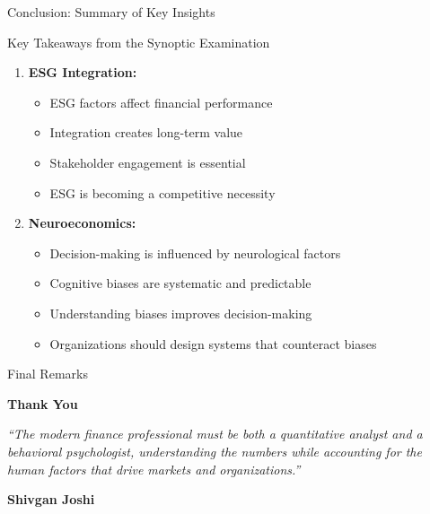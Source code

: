\documentclass[aspectratio=169]{beamer}
\begin{document}
\begin{frame}{Conclusion: Summary of Key Insights}
\begin{block}{Key Takeaways from the Synoptic Examination}
\begin{enumerate}
				\item \textbf{ESG Integration:}
				\begin{itemize}
					\item ESG factors affect financial performance
					\item Integration creates long-term value
					\item Stakeholder engagement is essential
					\item ESG is becoming a competitive necessity
				\end{itemize}
				
				\item \textbf{Neuroeconomics:}
				\begin{itemize}
					\item Decision-making is influenced by neurological factors
					\item Cognitive biases are systematic and predictable
					\item Understanding biases improves decision-making
					\item Organizations should design systems that counteract biases
				\end{itemize}
			\end{enumerate}
		\end{block}
	\end{frame}
	
	\begin{frame}{Final Remarks}
		\begin{center}
			\Huge\textcolor{navyblue}{\textbf{Thank You}}
			\vspace{0.5cm}
			
			\Large\textit{``The modern finance professional must be both a quantitative analyst and a behavioral psychologist, understanding the numbers while accounting for the human factors that drive markets and organizations.''}
			\vspace{0.5cm}
			
			\large\textbf{Shivgan Joshi}
			\vspace{0.2cm}
		\end{center}
	\end{frame}
	
\end{document}
